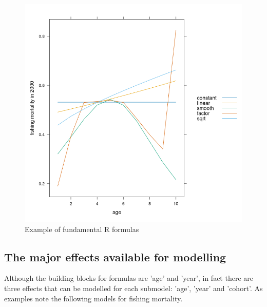 \documentclass[a4paper,english,11pt]{article}
\begin{document}
\begin{knitrout}
\begin{figure}[H]
{\centering \includegraphics[width=.9\linewidth]{figure/fund_forms_age-1} 

}

\caption[Example of fundamental R formulas]{Example of fundamental R formulas}\label{fig:fund_forms_age}
\end{figure}

\end{knitrout}

\subsection{The major effects available for modelling}

Although the building blocks for formulas are 'age' and 'year', in fact there are three effects that can be modelled for each submodel: 'age', 'year' and 'cohort'. As examples note the following models for fishing mortality.

\begin{knitrout}
\color{fgcolor}\begin{kframe}
\begin{alltt}
 \hlkwb{<-} \hlopt{~}

 \hlkwb{<-} \hlopt{~}

 \hlkwb{<-} \hlopt{~} \hlopt{-} 

 \hlkwb{<-}   
 \hlkwb{<-}   
 \hlkwb{<-}   
\end{alltt}
\end{kframe}
\end{knitrout}
\end{document}
